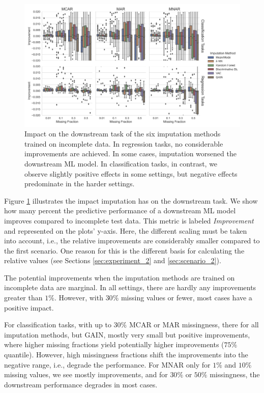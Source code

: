 \documentclass[utf8]{frontiersSCNS} %
\begin{document}
\begin{figure}\centering
	\includegraphics[width=1\columnwidth]{corrupted_downstream_boxplot}

	\caption{Impact on the downstream task of the six imputation methods trained on incomplete data. In regression tasks, no considerable improvements are achieved. In some cases, imputation worsened the downstream ML model. In classification tasks, in contrast, we observe slightly positive effects in some settings, but negative effects predominate in the harder settings.
	}
	\label{fig:corrupted_downstream_boxplot}
\end{figure}


Figure \ref{fig:corrupted_downstream_boxplot} illustrates the impact imputation has on the downstream task. We show how many percent the predictive performance of a downstream ML model improves compared to incomplete test data. This metric is labeled \textit{Improvement} and represented on the plots' y-axis. Here, the different scaling must be taken into account, i.e., the relative improvements are considerably smaller compared to the first scenario. One reason for this is the different basis for calculating the relative values (see Sections \ref{sec:experiment_2} and \ref{sec:scenario_2}).

The potential improvements when the imputation methods are trained on incomplete data are marginal. In all settings, there are hardly any improvements greater than $1\%$. However, with $30\%$ missing values or fewer, most cases have a positive impact.

For classification tasks, with up to $30\%$ MCAR or MAR missingness, there for all imputation methods, but GAIN, mostly very small but positive improvements, where higher missing fractions yield potentially higher improvements ($75\%$ quantile). However, high missingness fractions shift the improvements into the negative range, i.e., degrade the performance. For MNAR only for $1\%$ and $10\%$ missing values, we see mostly improvements, and for $30\%$ or $50\%$ missingness, the downstream performance degrades in most cases.
\end{document}
